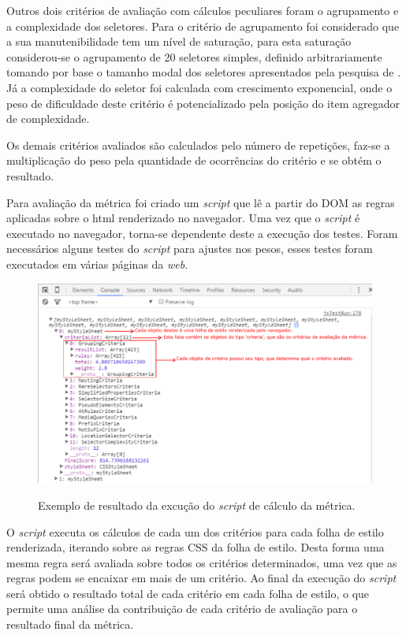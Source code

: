 Outros dois critérios de avaliação com cálculos peculiares foram o agrupamento e a complexidade dos seletores. Para o critério de agrupamento foi considerado que a sua manutenibilidade tem um nível de saturação, para esta saturação considerou-se o agrupamento de 20 seletores simples, definido arbitrariamente tomando por base o tamanho modal dos seletores apresentados pela pesquisa de . Já a complexidade do seletor foi calculada com crescimento exponencial, onde o peso de dificuldade deste critério é potencializado pela posição do item agregador de complexidade.

Os demais critérios avaliados são calculados pelo número de repetições, faz-se a multiplicação do peso pela quantidade de ocorrências do critério e se obtém o resultado.

Para avaliação da métrica foi criado um \textit{script} que lê a partir do DOM as regras aplicadas sobre o html renderizado no navegador. Uma vez que o \textit{script} é executado no navegador, torna-se dependente deste a execução dos testes. Foram necessários alguns testes do \textit{script} para ajustes nos pesos, esses testes foram executados em várias páginas da \textit{web}.

\begin{figure}[!htb]
	\centering
	\caption{Exemplo de resultado da excução do \textit{script} de cálculo da métrica.}
	\includegraphics[width=1\textwidth]{./04-figuras/calculator}
	\label{fig:calculatorTest}
\end{figure}

O \textit{script} executa os cálculos de cada um dos critérios para cada folha de estilo renderizada, iterando sobre as regras CSS da folha de estilo. Desta forma uma mesma regra será avaliada sobre todos os critérios determinados, uma vez que as regras podem se encaixar em mais de um critério. Ao final da execução do \textit{script} será obtido o resultado total de cada critério em cada folha de estilo, o que permite uma análise da contribuição de cada critério de avaliação para o resultado final da métrica.

